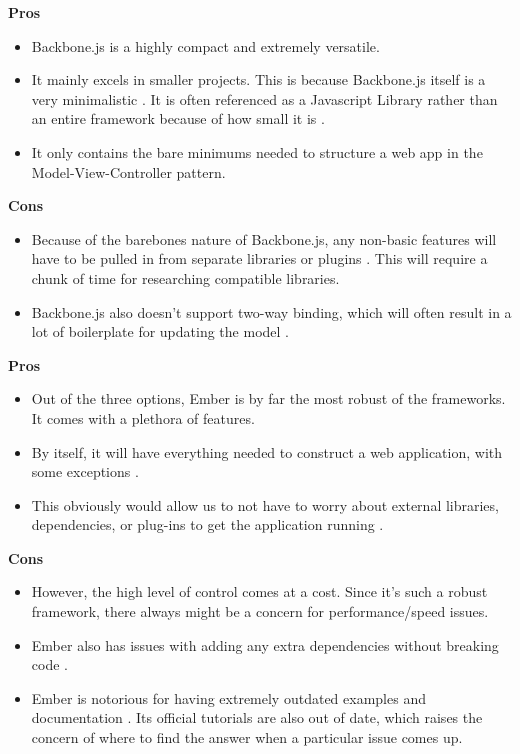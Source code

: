 	\textbf{Pros}	
			\begin{itemize}
				\item Backbone.js is a highly compact and extremely versatile. 
				\item It mainly excels in smaller projects. This is because Backbone.js itself is a very minimalistic \cite{mvc}. It is often referenced as a Javascript Library rather than an entire framework because of how small it is \cite{mvc}. 
				\item It only contains the bare minimums needed to structure a web app in the Model-View-Controller pattern.
			\end{itemize}
	\textbf{Cons}
		\begin{itemize}
			\item Because of the barebones nature of Backbone.js, any non-basic features will have to be pulled in from separate libraries or plugins \cite{mvc}. This will require a chunk of time for researching compatible libraries. 
			\item Backbone.js also doesn't support two-way binding, which will often result in a lot of boilerplate for updating the model \cite{mvc}.
		\end{itemize}
	
		\textbf{Pros}
			\begin{itemize}
				\item Out of the three options, Ember is by far the most robust of the frameworks. It comes with a plethora of features. 
				\item By itself, it will have everything needed to construct a web application, with some exceptions \cite{mvc}. 
				\item This obviously would allow us to not have to worry about external libraries, dependencies, or plug-ins to get the application running \cite{mvc}.
			\end{itemize}
		\textbf{Cons}
			\begin{itemize}
				\item However, the high level of control comes at a cost. Since it's such a robust framework, there always might be a concern for performance/speed issues. 
				\item Ember also has issues with adding any extra dependencies without breaking code \cite{mvc}.
				\item Ember is notorious for having extremely outdated examples and documentation \cite{mvc}. Its official tutorials are also out of date, which raises the concern of where to find the answer when a particular issue comes up.
			\end{itemize}	

